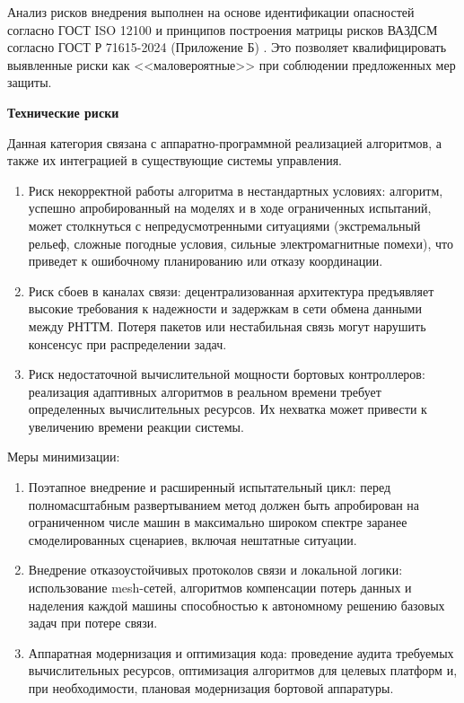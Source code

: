 Анализ рисков внедрения выполнен на основе идентификации опасностей согласно ГОСТ ISO 12100 и принципов построения матрицы рисков ВАЗДСМ согласно ГОСТ Р 71615-2024 (Приложение Б) \cite{gostR71615}. Это позволяет квалифицировать выявленные риски как <<маловероятные>> при соблюдении предложенных мер защиты.

\textbf{Технические риски}

Данная категория связана с аппаратно-программной реализацией алгоритмов, а также их интеграцией в существующие системы управления.

\begin{enumerate}[beginpenalty=10000, midpenalty=10000, wide=\parindent, leftmargin=0pt]
	\item Риск некорректной работы алгоритма в нестандартных условиях: алгоритм, успешно апробированный на моделях и в ходе ограниченных испытаний, может столкнуться с непредусмотренными ситуациями (экстремальный рельеф, сложные погодные условия, сильные электромагнитные помехи), что приведет к ошибочному планированию или отказу координации.
	\item Риск сбоев в каналах связи: децентрализованная архитектура предъявляет высокие требования к надежности и задержкам в сети обмена данными между РНТТМ. Потеря пакетов или нестабильная связь могут нарушить консенсус при распределении задач.
	\item Риск недостаточной вычислительной мощности бортовых контроллеров: реализация адаптивных алгоритмов в реальном времени требует определенных вычислительных ресурсов. Их нехватка может привести к увеличению времени реакции системы.
\end{enumerate}

Меры минимизации:
\begin{enumerate}[beginpenalty=10000, midpenalty=10000, wide=\parindent, leftmargin=0pt]
	\item Поэтапное внедрение и расширенный испытательный цикл: перед полномасштабным развертыванием метод должен быть апробирован на ограниченном числе машин в максимально широком спектре заранее смоделированных сценариев, включая нештатные ситуации.
	\item Внедрение отказоустойчивых протоколов связи и локальной логики: использование mesh-сетей, алгоритмов компенсации потерь данных и наделения каждой машины способностью к автономному решению базовых задач при потере связи.
	\item Аппаратная модернизация и оптимизация кода: проведение аудита требуемых вычислительных ресурсов, оптимизация алгоритмов для целевых платформ и, при необходимости, плановая модернизация бортовой аппаратуры.
\end{enumerate}

